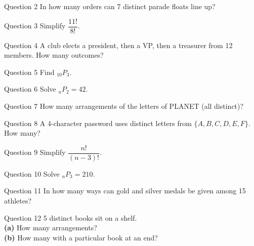 \documentclass[11pt]{article}
\begin{document}
\begin{qbox}{Question 2}
In how many orders can 7 distinct parade floats line up?\workspace{2.4cm}
\end{qbox}

\begin{qbox}{Question 3}
Simplify $\dfrac{11!}{8!}$.\workspace{2.4cm}
\end{qbox}

\begin{qbox}{Question 4}
A club elects a president, then a VP, then a treasurer from 12 members. How many outcomes?\workspace{2.4cm}
\end{qbox}

\begin{qbox}{Question 5}
Find $_{10}P_3$.\workspace{2.4cm}
\end{qbox}

\begin{qbox}{Question 6}
Solve $_nP_2=42$.\workspace{2.4cm}
\end{qbox}

\begin{qbox}{Question 7}
How many arrangements of the letters of PLANET (all distinct)?\workspace{2.4cm}
\end{qbox}

\begin{qbox}{Question 8}
A 4-character password uses distinct letters from $\{A,B,C,D,E,F\}$. How many?\workspace{2.4cm}
\end{qbox}

\begin{qbox}{Question 9}
Simplify $\dfrac{n!}{(n-3)!}$.\workspace{2.4cm}
\end{qbox}

\begin{qbox}{Question 10}
Solve $_nP_3=210$.\workspace{2.4cm}
\end{qbox}

\begin{qbox}{Question 11}
In how many ways can gold and silver medals be given among 15 athletes?\workspace{2.4cm}
\end{qbox}

\begin{qbox}{Question 12}
5 distinct books sit on a shelf. \\ \textbf{(a)} How many arrangements? \\ \textbf{(b)} How many with a particular book at an end?\workspace{2.4cm}
\end{qbox}
\end{document}
